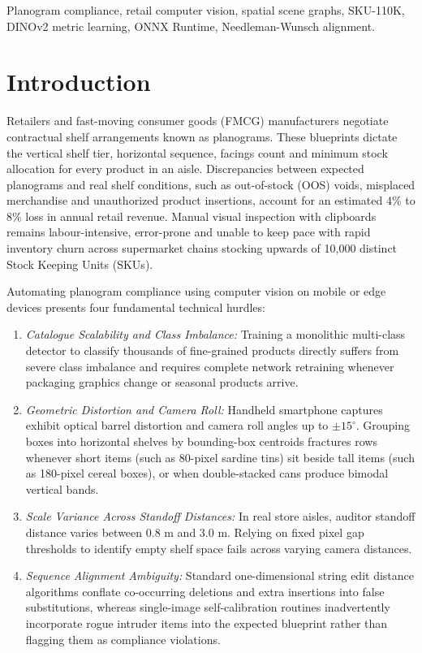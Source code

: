 \documentclass[conference]{IEEEtran}
\begin{document}
\begin{IEEEkeywords}
Planogram compliance, retail computer vision, spatial scene graphs, SKU-110K, DINOv2 metric learning, ONNX Runtime, Needleman-Wunsch alignment.
\end{IEEEkeywords}

\section{Introduction}
Retailers and fast-moving consumer goods (FMCG) manufacturers negotiate contractual shelf arrangements known as planograms. These blueprints dictate the vertical shelf tier, horizontal sequence, facings count and minimum stock allocation for every product in an aisle. Discrepancies between expected planograms and real shelf conditions, such as out-of-stock (OOS) voids, misplaced merchandise and unauthorized product insertions, account for an estimated 4\% to 8\% loss in annual retail revenue. Manual visual inspection with clipboards remains labour-intensive, error-prone and unable to keep pace with rapid inventory churn across supermarket chains stocking upwards of 10,000 distinct Stock Keeping Units (SKUs).

Automating planogram compliance using computer vision on mobile or edge devices presents four fundamental technical hurdles:
\begin{enumerate}
    \item \textit{Catalogue Scalability and Class Imbalance:} Training a monolithic multi-class detector to classify thousands of fine-grained products directly suffers from severe class imbalance and requires complete network retraining whenever packaging graphics change or seasonal products arrive.
    \item \textit{Geometric Distortion and Camera Roll:} Handheld smartphone captures exhibit optical barrel distortion and camera roll angles up to $\pm 15^\circ$. Grouping boxes into horizontal shelves by bounding-box centroids fractures rows whenever short items (such as 80-pixel sardine tins) sit beside tall items (such as 180-pixel cereal boxes), or when double-stacked cans produce bimodal vertical bands.
    \item \textit{Scale Variance Across Standoff Distances:} In real store aisles, auditor standoff distance varies between 0.8 m and 3.0 m. Relying on fixed pixel gap thresholds to identify empty shelf space fails across varying camera distances.
    \item \textit{Sequence Alignment Ambiguity:} Standard one-dimensional string edit distance algorithms conflate co-occurring deletions and extra insertions into false substitutions, whereas single-image self-calibration routines inadvertently incorporate rogue intruder items into the expected blueprint rather than flagging them as compliance violations.
\end{enumerate}
\end{document}
